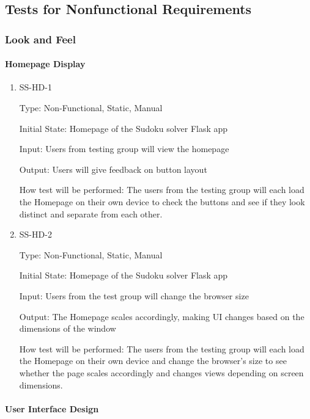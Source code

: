 \documentclass[11pt]{article}
\begin{document}
\subsection{Tests for Nonfunctional Requirements}

\subsubsection{Look and Feel}
		
\paragraph{Homepage Display}

\begin{enumerate}

\item{SS-HD-1\\}

Type: Non-Functional, Static, Manual
					
Initial State: Homepage of the Sudoku solver Flask app
					
Input: Users from testing group will view the homepage
					
Output: Users will give feedback on button layout
					
How test will be performed: The users from the testing group will each load the Homepage on their own device to check the buttons and see if they look distinct and separate from each other.
					
\item{SS-HD-2\\}

Type: Non-Functional, Static, Manual
					
Initial State: Homepage of the Sudoku solver Flask app
					
Input: Users from the test group will change the browser size
					
Output: The Homepage scales accordingly, making UI changes based on the dimensions of the window
					
How test will be performed: The users from the testing group will each load the Homepage on their own device and change the browser's size to see whether the page scales accordingly and changes views depending on screen dimensions.

\end{enumerate}

\paragraph{User Interface Design}
\end{document}

